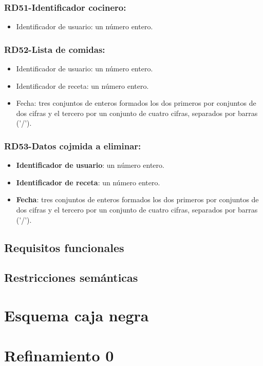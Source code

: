 \documentclass[a4paper,12pt]{report}
\begin{document}
\subsection{RD51-Identificador cocinero:}
\label{sec-2-1-51}
\begin{itemize}
\item Identificador de usuario: un número entero.
\end{itemize}
\subsection{RD52-Lista de comidas:}
\label{sec-2-1-52}
\begin{itemize}
\item Identificador de usuario: un número entero.
\item Identificador de receta: un número entero.
\item Fecha: tres conjuntos de enteros formados los dos primeros por
conjuntos de dos cifras y el tercero por un conjunto de cuatro
cifras, separados por barras ('/').
\end{itemize}
\subsection{RD53-Datos cojmida a eliminar:}
\label{sec-2-1-53}
\begin{itemize}
\item \textbf{Identificador de usuario}: un número entero.
\item \textbf{Identificador de receta}: un número entero.
\item \textbf{Fecha}: tres conjuntos de enteros formados los dos primeros por
conjuntos de dos cifras y el tercero por un conjunto de cuatro
cifras, separados por barras ('/').
\end{itemize}

\section{Requisitos funcionales}
\label{sec-2-2}
\section{Restricciones semánticas}
\label{sec-2-3}
\chapter{Esquema caja negra}
\label{sec-3}
\chapter{Refinamiento 0}
\label{sec-4}
\end{document}
